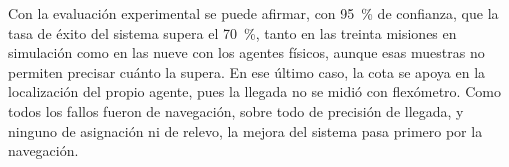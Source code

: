 Con la evaluación experimental se puede afirmar, con 95~\% de confianza, que la tasa de
éxito del sistema supera el 70~\%, tanto en las treinta misiones en simulación como en
las nueve con los agentes físicos, aunque esas muestras no permiten precisar cuánto la
supera. En ese último caso, la cota se apoya en la localización del propio agente, pues la
llegada no se midió con flexómetro. Como todos los fallos fueron de navegación, sobre
todo de precisión de llegada, y ninguno de asignación ni de relevo, la mejora del
sistema pasa primero por la navegación.
